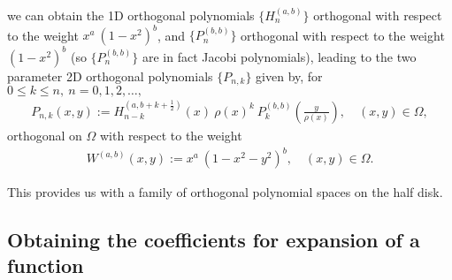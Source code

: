 \documentclass[11pt, oneside]{article}   	%
\newcommand{\half}{\frac{1}{2}}
\newcommand{\Pnk}{P_{n,k}}
\begin{document}
we can obtain the 1D orthogonal polynomials \(\{H_n^{(a, b)}\}\) orthogonal with respect to the weight \(x^a \: (1-x^2)^b\), and \(\{P_n^{(b, b)}\}\) orthogonal with respect to the weight \((1-x^2)^b\) (so \(\{P_n^{(b, b)}\}\) are in fact Jacobi polynomials), leading to the two parameter 2D orthogonal polynomials \(\{\Pnk\}\) given by, for \(0 \le k \le n, \: n = 0,1,2,\dots,\)
\begin{align}
 \Pnk(x,y) := H_{n-k}^{(a, b+k+\half)}(x) \: \rho(x)^k \: P_k^{(b,b)}(\frac{y}{\rho(x)}), \quad (x,y) \in \Omega, 
\end{align}
orthogonal on \(\Omega\) with respect to the weight 
\begin{align}
W^{(a,b)}(x,y) := x^a \: (1-x^2-y^2)^b, \quad (x,y) \in \Omega.
\end{align}

This provides us with a family of orthogonal polynomial spaces on the half disk.


\subsection{Obtaining the coefficients for expansion of a function}
\end{document}
